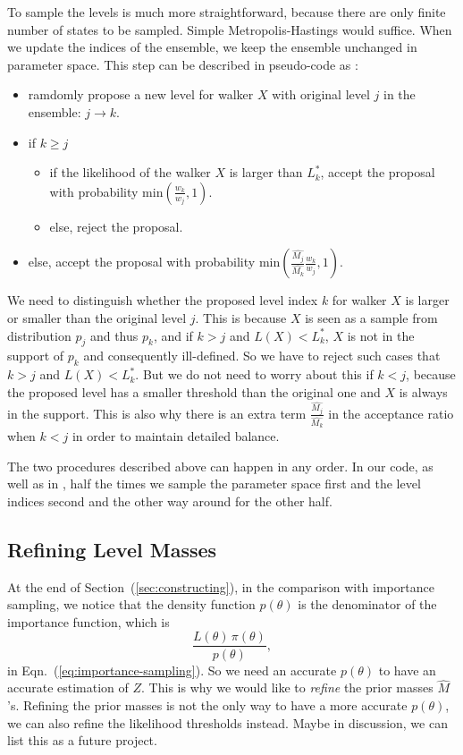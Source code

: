\documentclass[letterpaper, preprint]{aastex}
\newcommand{\qer}[1]{{\color{red}#1}}
\begin{document}
To sample the levels is much more straightforward, because there are only finite number of states to be sampled. Simple Metropolis-Hastings would suffice. When we update the indices of the ensemble, we keep the ensemble unchanged in parameter space. This step can be described in pseudo-code as \citep{brewer11a}:
\begin{sffamily}
\begin{itemize}
\item ramdomly propose a new level for walker $X$ with original level $j$ in the ensemble: $j \rightarrow k$.
\item if $k \geq j$
\begin{itemize}
\item if the likelihood of the walker $X$ is larger than $L^*_k$, accept the proposal with probability $\mathrm{min}\left(\frac{w_k}{w_j},1\right)$.
\item else, reject the proposal.
\end{itemize}
\item else, accept the proposal with probability $\mathrm{min}\left(\frac{\widehat{M_j}}{\widehat{M_k}}\frac{w_k}{w_j},1\right)$.
\end{itemize}
\end{sffamily}
We need to distinguish whether the proposed level index $k$ for walker $X$ is larger or smaller than the original level $j$. This is because $X$ is seen as a sample from distribution $p_j$ and thus $p_k$, and if $k>j$ and $L(X) < L^*_k$, $X$ is not in the support of $p_k$ and consequently ill-defined. So we have to reject such cases that $k>j$ and $L(X) < L^*_k$. But we do not need to worry about this if $k<j$, because the proposed level has a smaller threshold than the original one and $X$ is always in the support. This is also why there is an extra term $\frac{\widehat{M_j}}{\widehat{M_k}}$ in the acceptance ratio when $k<j$ in order to maintain detailed balance.

The two procedures described above can happen in any order. In our code, as well as in \citep{brewer11a}, half the times we sample the parameter space first and the level indices second and the other way around for the other half.

\subsection{Refining Level Masses}
\label{sec:refining-level-masses}

At the end of Section~(\ref{sec:constructing}), in the comparison with importance sampling, we notice that the density function $p(\theta)$ is the denominator of the importance function, which is
$$
\frac{L(\theta)\,\pi(\theta)}{p(\theta)},
$$
 in Eqn.~(\ref{eq:importance-sampling}). So we need an accurate $p(\theta)$ to have an accurate estimation of $Z$. This is why we would like to \textit{refine} the prior masses $\widehat{M}$'s. Refining the prior masses is not the only way to have a more accurate $p(\theta)$, we can also refine the likelihood thresholds instead. 
\qer{Maybe in discussion, we can list this as a future project.}
\end{document}
